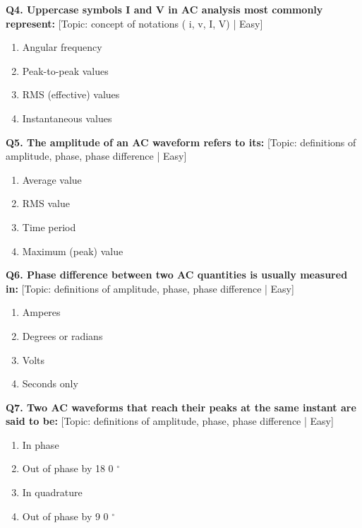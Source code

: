 \noindent\textbf{Q4. Uppercase symbols I and V in AC analysis most commonly represent:} \hfill [Topic: concept of notations ( i, v, I, V) | Easy]
\begin{enumerate}[label=(\alph*),topsep=2pt,itemsep=1pt,partopsep=0pt,parsep=0pt]
    \item {Angular frequency}
    \item {Peak-to-peak values}
    \item {RMS (effective) values}
    \item {Instantaneous values}
\end{enumerate}
\vspace{2mm}

\noindent\textbf{Q5. The amplitude of an AC waveform refers to its:} \hfill [Topic: definitions of amplitude, phase, phase difference | Easy]
\begin{enumerate}[label=(\alph*),topsep=2pt,itemsep=1pt,partopsep=0pt,parsep=0pt]
    \item {Average value}
    \item {RMS value}
    \item {Time period}
    \item {Maximum (peak) value}
\end{enumerate}
\vspace{2mm}

\noindent\textbf{Q6. Phase difference between two AC quantities is usually measured in:} \hfill [Topic: definitions of amplitude, phase, phase difference | Easy]
\begin{enumerate}[label=(\alph*),topsep=2pt,itemsep=1pt,partopsep=0pt,parsep=0pt]
    \item {Amperes}
    \item {Degrees or radians}
    \item {Volts}
    \item {Seconds only}
\end{enumerate}
\vspace{2mm}

\noindent\textbf{Q7. Two AC waveforms that reach their peaks at the same instant are said to be:} \hfill [Topic: definitions of amplitude, phase, phase difference | Easy]
\begin{enumerate}[label=(\alph*),topsep=2pt,itemsep=1pt,partopsep=0pt,parsep=0pt]
    \item {In phase}
    \item {Out of phase by 18 0 $^\circ$}
    \item {In quadrature}
    \item {Out of phase by 9 0 $^\circ$}
\end{enumerate}
\vspace{2mm}

